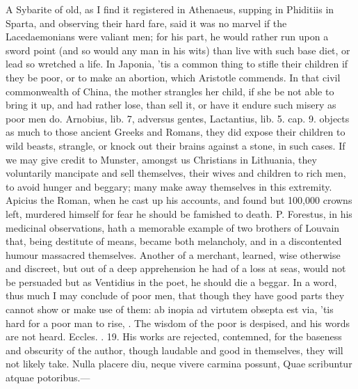 {A Sybarite of old, as I find it registered in Athenaeus, supping
in Phiditiis in Sparta, and observing their hard fare, said it was no
marvel if the Lacedaemonians were valiant men; for his part, he would
rather run upon a sword point (and so would any man in his wits) than
live with such base diet, or lead so wretched a life. In Japonia,
'tis a common thing to stifle their children if they be poor, or to
make an abortion, which Aristotle commends. In that civil commonwealth
of China, the mother strangles her child, if she be not able to
bring it up, and had rather lose, than sell it, or have it endure such
misery as poor men do. Arnobius, lib. 7, adversus gentes,
Lactantius, lib. 5. cap. 9. objects as much to those ancient
Greeks and Romans, they did expose their children to wild beasts,
strangle, or knock out their brains against a stone, in such cases. If
we may give credit to Munster, amongst us Christians in
Lithuania, they voluntarily mancipate and sell themselves, their wives
and children to rich men, to avoid hunger and beggary;  many make
away themselves in this extremity. Apicius the Roman, when he cast up
his accounts, and found but 100,000 crowns left, murdered himself for
fear he should be famished to death. P. Forestus, in his medicinal
observations, hath a memorable example of two brothers of Louvain that,
being destitute of means, became both melancholy, and in a discontented
humour massacred themselves. Another of a merchant, learned, wise
otherwise and discreet, but out of a deep apprehension he had of a loss
at seas, would not be persuaded but as Ventidius in the poet, he
should die a beggar. In a word, thus much I may conclude of poor men,
that though they have good parts they cannot show or make use of
them: ab inopia ad virtutem obsepta est via, 'tis hard for a poor
man to  rise, . The wisdom of the poor is despised, and his words
are not heard. Eccles. . 19. His works are rejected, contemned, for
the baseness and obscurity of the author, though laudable and good in
themselves, they will not likely take.
Nulla placere diu, neque vivere carmina possunt,
Quae scribuntur atquae potoribus.---

}
